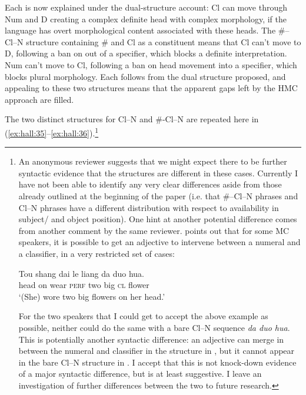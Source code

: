 \documentclass[output=paper
,modfonts
,nonflat]{langsci/langscibook}
\begin{document}
Each is now explained under the dual-structure account: Cl can move through Num and D creating a complex definite head with complex morphology, if the language has overt morphological content associated with these heads. The \#--Cl--N structure containing \# and Cl as a constituent means that Cl can't move to D, following a ban on  out of a specifier, which blocks a definite interpretation. Num can't move to Cl, following a ban on head movement into a specifier, which blocks plural morphology. Each follows from the dual structure proposed, and appealing to these two structures means that the apparent gaps left by the HMC approach are filled. 

The two distinct structures for Cl--N and \#-Cl--N are repeated here in (\ref{ex:hall:35}--\ref{ex:hall:36}).\footnote{An anonymous reviewer suggests that we might expect there to be further syntactic evidence that the structures are different in these cases. Currently I have not been able to identify any very clear differences aside from those already outlined at the beginning of the paper (i.e. that \#--Cl--N phrases and Cl--N phrases have a different distribution with respect to availability in subject/ and object position). One hint at another potential difference comes from another comment by the same reviewer. \citet{Li2011} points out that for some MC speakers, it is possible to get an adjective to intervene between a numeral and a classifier, in a very restricted set of cases:
	
\begin{exe}
\gll
Tou shang dai le liang da duo hua.\\
{\footnotesize head} {\footnotesize on} {\footnotesize wear} \textsc{\footnotesize perf} {\footnotesize two} {\footnotesize big} \textsc{\footnotesize cl} {\footnotesize flower}\\
\glt
\footnotesize `(She) wore two big flowers on her head.'\\
\end{exe}

For the two speakers that I could get to accept the above example as possible, neither could do the same with a bare Cl--N sequence \textit{da duo hua}. This is potentially another syntactic difference: an adjective can merge in between the numeral and classifier in the structure in , but it cannot appear in the bare Cl--N structure in . I accept that this is not knock-down evidence of a major syntactic difference, but is at least suggestive. I leave an investigation of further differences between the two to future research.}
\end{document}

